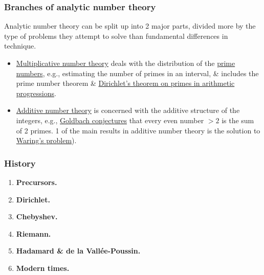 \documentclass{article}
\begin{document}
\subsubsection{Branches of analytic number theory}
Analytic number theory can be split up into 2 major parts, divided more by the type of problems they attempt to solve than fundamental differences in technique.
\begin{itemize}
	\item \href{https://en.wikipedia.org/wiki/Multiplicative_number_theory}{Multiplicative number theory} deals with the distribution of the \href{https://en.wikipedia.org/wiki/Prime_number}{prime numbers}, e.g., estimating the number of primes in an interval, \& includes the prime number theorem \& \href{https://en.wikipedia.org/wiki/Dirichlet%27s_theorem_on_arithmetic_progressions}{Dirichlet's theorem on primes in arithmetic progressions}.
	\item \href{https://en.wikipedia.org/wiki/Additive_number_theory}{Additive number theory} is concerned with the additive structure of the integers, e.g., \href{https://en.wikipedia.org/wiki/Goldbach_conjecture}{Goldbach conjectures} that every even number $> 2$ is the sum of 2 primes. 1 of the main results in additive number theory is the solution to \href{https://en.wikipedia.org/wiki/Waring%27s_problem}{Waring's problem}).
\end{itemize}

\subsubsection{History}

\begin{enumerate}
	\item {\bf Precursors.}
	\item {\bf Dirichlet.}
	\item {\bf Chebyshev.}
	\item {\bf Riemann.}
	\item {\bf Hadamard \& de la Vall\'ee-Poussin.}
	\item {\bf Modern times.}
\end{enumerate}
\end{document}
